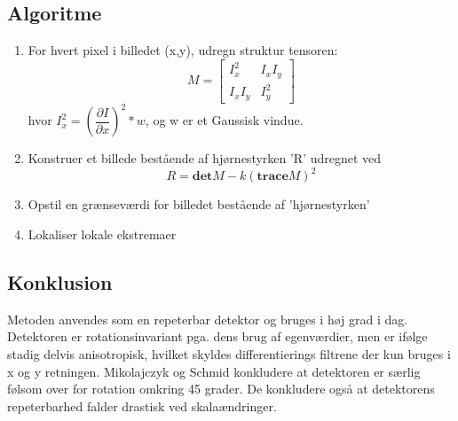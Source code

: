 \subsection*{Algoritme}
\begin{enumerate}
\item{ For hvert pixel i billedet (x,y), udregn struktur tensoren: $$ M = \begin{bmatrix}
I_x^2 & I_xI_y \\
I_xI_y & I_y^2
\end{bmatrix} $$hvor $ I_x^2 = (\dfrac{\partial I}{\partial x})^2 \ast w$, og w er et Gaussisk vindue.}
\item{ Konstruer et billede bestående af hjørnestyrken 'R' udregnet ved $$ R = \textbf{det}M-k(\textbf{trace}M)^2 $$  }
\item{ Opstil en grænseværdi for billedet bestående af 'hjørnestyrken'}
\item{ Lokaliser lokale ekstremaer }
\end{enumerate}
\subsection*{Konklusion}
Metoden anvendes som en repeterbar detektor og bruges i høj grad i dag. Detektoren er rotationsinvariant pga. dens brug af egenværdier, men er ifølge \cite{eval} stadig delvis anisotropisk, hvilket skyldes differentierings filtrene der kun bruges i x og y retningen. Mikolajczyk og Schmid \cite{eval} konkludere at detektoren er særlig følsom over for rotation omkring 45 grader. De konkludere også at detektorens repeterbarhed falder drastisk ved skalaændringer.
